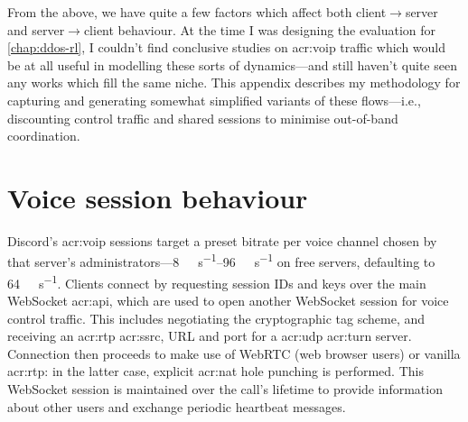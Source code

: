 From the above, we have quite a few factors which affect both client$\rightarrow$server and server$\rightarrow$client behaviour.
At the time I was designing the evaluation for \cref{chap:ddos-rl}, I couldn't find conclusive studies on \gls{acr:voip} traffic which would be at all useful in modelling these sorts of dynamics---and still haven't quite seen any works which fill the same niche.
This appendix describes my methodology for capturing and generating somewhat simplified variants of these flows---i.e., discounting control traffic and shared sessions to minimise out-of-band coordination.

%


\section{Voice session behaviour}
Discord's \gls{acr:voip} sessions target a preset bitrate per voice channel chosen by that server's administrators---\qtyrange{8}{96}{\kilo\bit\per\second} on free servers, defaulting to \qty{64}{\kilo\bit\per\second}.
Clients connect by requesting session IDs and keys over the main WebSocket \gls{acr:api}, which are used to open another WebSocket session for voice control traffic.
This includes negotiating the cryptographic tag scheme, and receiving an \gls{acr:rtp} \gls{acr:ssrc}, URL and port for a \gls{acr:udp} \gls{acr:turn} server.
Connection then proceeds to make use of WebRTC (web browser users) or vanilla \gls{acr:rtp}: in the latter case, explicit \gls{acr:nat} hole punching is performed.
This WebSocket session is maintained over the call's lifetime to provide information about other users and exchange periodic heartbeat messages.



